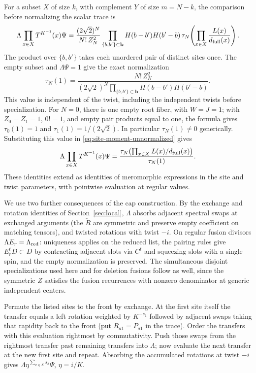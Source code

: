 For a subset \(X\) of size \(k\), with complement \(Y\) of size \(m=N-k\), the comparison before normalizing the scalar trace is
\begin{equation}\label{eq:site-moment-unnormalized}
 \Lambda \prod_{x\in X}T^{K^{-1}}(x)\Psi
 =\frac{(2\sqrt2)^N}{N!\,Z_N^2}
  \prod_{\{b,b'\}\subset\mathbf b}H(b-b')H(b'-b)\,
  \tau_N\!\left(\prod_{x\in X}\frac{L(x)}{d_{\rm full}(x)}\right).
\end{equation}
The product over \(\{b,b'\}\) takes each unordered pair of distinct sites once. The empty subset and \(\Lambda\Psi=1\) give the exact normalization
\begin{equation}\label{eq:trace-normalization}
 \tau_N(1)=
 \frac{N!\,Z_N^2}
 {(2\sqrt2)^N\displaystyle\prod_{\{b,b'\}\subset\mathbf b}
                     H(b-b')H(b'-b)}.
\end{equation}
This value is independent of the twist, including the independent twists before specialization. For \(N=0\), there is one empty root fiber, with \(W=J=1\); with \(Z_0=Z_1=1\), \(0!=1\), and empty pair products equal to one, the formula gives \(\tau_0(1)=1\) and \(\tau_1(1)=1/(2\sqrt2)\). In particular \(\tau_N(1)\ne0\) generically. Substituting this value in \eqref{eq:site-moment-unnormalized} gives
\begin{equation}\label{eq:site-moment}
 \Lambda \prod_{x\in X}T^{K^{-1}}(x)\Psi
 = \frac{\tau_N\!\left(\prod_{x\in X}L(x)/d_{\rm full}(x)\right)}{\tau_N(1)}.
\end{equation}
These identities extend as identities of meromorphic expressions in the site and twist parameters, with pointwise evaluation at regular values.

We use two further consequences of the cap construction. By the exchange and rotation identities of Section~\ref{sec:local}, \(\Lambda\) absorbs adjacent spectral swaps at exchanged arguments (the \(\check R\) are symmetric and preserve empty coefficient on matching tensors), and twisted rotations with twist \(-i\). On regular fusion divisors \(\Lambda E_r=\Lambda_{\rm red}\): uniqueness applies on the reduced list, the pairing rules give \(E_r^tD\subset D\) by contracting adjacent slots via \(C^t\) and squeezing slots with a single spin, and the empty normalization is preserved. The simultaneous disjoint specializations used here and for deletion fusions follow as well, since the symmetric \(Z\) satisfies the fusion recurrences with nonzero denominator at generic independent centers.

Permute the listed sites to the front by exchange. At the first site itself the transfer equals a left rotation weighted by \(K^{-s_1}\) followed by adjacent swaps taking that rapidity back to the front (put \(R_{a1}=P_{a1}\) in the trace). Order the transfers with this evaluation rightmost by commutativity. Push those swaps from the rightmost transfer past remaining transfers into \(\Lambda\); now evaluate the next transfer at the new first site and repeat. Absorbing the accumulated rotations at twist \(-i\) gives \(\Lambda\eta^{\sum_{x\in X}s_x}\Psi\), \(\eta=i/K\).

